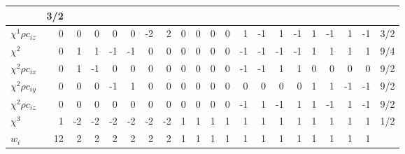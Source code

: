 \begin{table}
\begin{tabular}{|l||r|rrrrrr|rrrr|rrrr|rrrr|r||}
& 3/2\\
\hline
$\chi^1 \rho c_{iz}$ & 0 &  0 &  0 &  0&  0 &  -2 &  2 & 
         0 &  0 &  0 &  0 &  1 &  -1 & 1 & -1 & 1 & -1 & 1 & -1
& 3/2\\
\hline
$\chi^2$ & 0 &  1 &  1 &  -1&  -1 &  0 &  0 & 
         0 &  0 &  0 &  0 &  -1 &  -1 & -1 & -1 & 1 & 1 & 1 & 1
& 9/4\\
\hline
$\chi^2 \rho c_{ix}$ & 0 &  1 &  -1 &  0&  0 &  0 &  0 & 
         0 &  0 &  0 &  0 &  -1 &  -1 & 1 & 1 & 0 & 0 & 0 & 0
& 9/2\\
\hline
$\chi^2 \rho c_{iy}$ & 0 &  0 &  0 & -1&   1 &  0 &  0 & 
         0 &  0 &  0 &  0 &   0 &  0 & 0 & 0 & 1 &  1 & -1 & -1
& 9/2\\
\hline
$\chi^2 \rho c_{iz}$ & 0 &  0 &  0 &  0&  0 &  0 &  0 & 
         0 &  0 &  0 &  0 &  -1 &  1 & -1 & 1 & 1 & -1 & 1 & -1
& 9/2\\
\hline
$\chi^3$ & 1 &  -2 &  -2 &  -2&  -2 &  -2 &  -2 & 
         1 &  1 &  1 &  1 &  1 &  1 & 1 & 1 & 1 & 1 & 1 & 1
& 1/2\\
\hline\hline
$w_i$ & 12 & 2 & 2 & 2 & 2 & 2 & 2 & 
1 & 1 & 1 & 1 & 1 & 1 & 1 & 1 & 1 & 1 & 1 & 1
& \\
\hline\hline
\end{tabular}
\end{table}

\pagebreak
